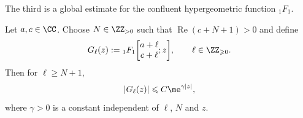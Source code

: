 The third is a global estimate for the confluent hypergeometric function $_1F_1$.

\begin{Lemma}\label{lem-1F1}
	Let $a,c\in\CC$. Choose $N\in\ZZ_{>0}$ such that $\operatorname{Re}(c+N+1)>0$ and define
	\begin{equation}\label{G_l definition}
			G_{\ell}(z):={}_1F_1\bigg[\begin{matrix}
				a+\ell\\
				c+\ell
			\end{matrix};z\bigg],\qquad \ell\in\ZZ_{\geqslant 0}.
	\end{equation}
	Then for $\ell\geqslant N+1$,
 \begin{equation}\label{G_l inequality}
			|G_\ell(z)|\leqslant C\me^{\gamma|z|},
	\end{equation}
	where $\gamma>0$ is a constant independent of $\ell$, $N$ and $z$.
\end{Lemma}

